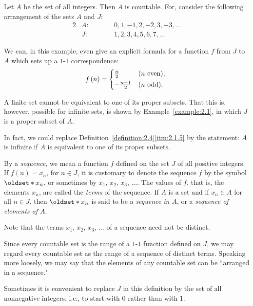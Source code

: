 \begin{example}\label{example:2.1}
    Let \(A\) be the set of all integers. Then \(A\) is countable. For, consider the following arrangement of the sets \(A\) and \(J\):
    \begin{alignat*}{2}
        &A\colon\qquad&&0,1,-1,2,-2,3,-3,\ldots\\
        &J\colon\qquad&&1,2,3,4,5,6,7,\ldots
    \end{alignat*}
\end{example}

We can, in this example, even give an explicit formula for a function \(f\) from \(J\) to \(A\) which sets up a \(1\)-\(1\) correspondence:
\begin{equation*}
    f\left(n\right)=
    \begin{cases*}
        \frac{n}{2} & (\(n\) even), \\
        -\frac{n-1}{2} & (\(n\) odd). \\
    \end{cases*}
\end{equation*}

\begin{remark}
    A finite set cannot be equivalent to one of its proper subsets. That this is, however, possible for infinite sets, is shown by Example~\ref{example:2.1}, in which \(J\) is a proper subset of \(A\).
    
    In fact, we could replace Definition~\ref{definition:2.4}\ref{itm:2.1.5} by the statement: \(A\) is infinite if \(A\) is equivalent to one of its proper subsets.
\end{remark}

\begin{definition}
    By a \emph{sequence}, we mean a function \(f\) defined on the set \(J\) of all positive integers. If \(f\left(n\right)=x_n\), for \(n\in J\), it is customary to denote the sequence \(f\) by the symbol \(\set{x_n}\), or sometimes by \(x_1\), \(x_2\), \(x_3\), \(\ldots\). The values of \(f\), that is, the elements \(x_n\), are called the \emph{terms} of the sequence. If \(A\) is a set and if \(x_n\in A\) for all \(n\in J\), then \(\set{x_n}\) is said to be a \emph{sequence in \(A\)}, or a \emph{sequence of elements of \(A\)}.
    
    Note that the terms \(x_1\), \(x_2\), \(x_3\), \(\ldots\) of a sequence need not be distinct.
    
    Since every countable set is the range of a \(1\)-\(1\) function defined on \(J\), we may regard every countable set as the range of a sequence of distinct terms. Speaking more loosely, we may say that the elements of any countable set can be ``arranged in a sequence."
    
    Sometimes it is convenient to replace \(J\) in this definition by the set of all nonnegative integers, i.e., to start with \(0\) rather than with \(1\).
\end{definition}

